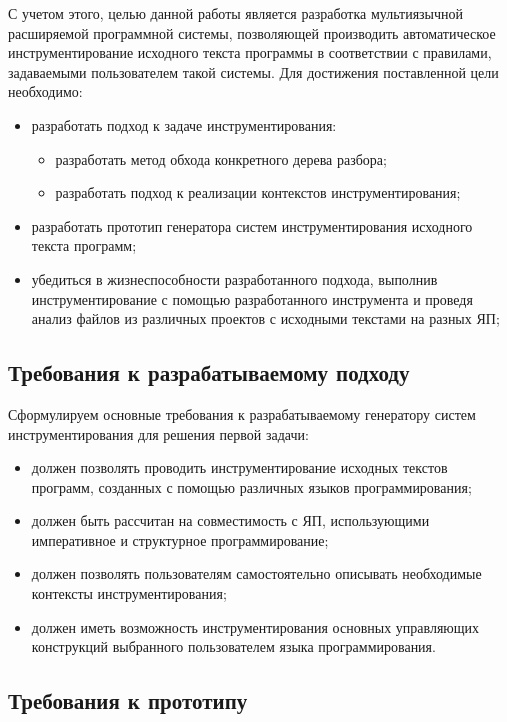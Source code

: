 С учетом этого, целью данной работы является разработка мультиязычной расширяемой программной системы, позволяющей производить автоматическое инструментирование исходного текста программы в соответствии с правилами, задаваемыми пользователем такой системы.
Для достижения поставленной цели необходимо:
\begin{itemize}[noitemsep]
  \item разработать подход к задаче инструментирования:
    \begin{itemize}[noitemsep]
      \item разработать метод обхода конкретного дерева разбора;
      \item разработать подход к реализации контекстов инструментирования;
    \end{itemize}
  \item разработать прототип генератора систем инструментирования исходного текста программ;
  \item убедиться в жизнеспособности разработанного подхода, выполнив инструментирование с помощью разработанного инструмента и проведя анализ файлов из различных проектов с исходными текстами на разных ЯП;
\end{itemize}

\subsection{Требования к разрабатываемому подходу}

Сформулируем основные требования к разрабатываемому генератору систем инструментирования для решения первой задачи:
\begin{itemize}[noitemsep]
  \item должен позволять проводить инструментирование исходных текстов программ, созданных с помощью различных языков программирования;
  \item должен быть рассчитан на совместимость с ЯП, использующими императивное и структурное программирование;
  \item должен позволять пользователям самостоятельно описывать необходимые контексты инструментирования;
  \item должен иметь возможность инструментирования основных управляющих конструкций выбранного пользователем языка программирования.
\end{itemize}

\subsection{Требования к прототипу}

